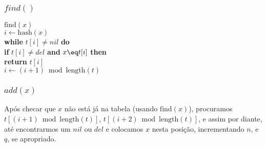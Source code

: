 \documentclass{beamer}
\begin{document}
\begin{frame}
	\frametitle{$find()$}
\begin{oframed}
\begin{flushleft}
\hspace*{1em} \ensuremath{\mathrm{find}(x)}\\
\hspace*{1em} \hspace*{1em} \ensuremath{i \gets  \ensuremath{\mathrm{hash}(x)}}\\
\hspace*{1em} \hspace*{1em} {\color{black} \textbf{while}} \ensuremath{t[i] \ne nil} {\color{black} \textbf{do}} \\
\hspace*{1em} \hspace*{1em} \hspace*{1em} {\color{black} \textbf{if}} \ensuremath{t[i] \ne \mathit{del}} {\color{black} \textbf{and}} \ensuremath{x \eq t[i]} {\color{black} \textbf{then}}  \\
\hspace*{1em} \hspace*{1em} \hspace*{1em} \hspace*{1em} {\color{black} \textbf{return}} \ensuremath{t[i]}\\
\hspace*{1em} \hspace*{1em} \hspace*{1em} \ensuremath{i \gets  \ensuremath{(i + 1) \bmod  \mathrm{length}(t)}}\\
\end{flushleft}
\end{oframed}

\end{frame}

\begin{frame}
\frametitle{$add(x)$}

Após checar que $ \ensuremath{x}$ não está já na tabela (usando $ \ensuremath{\mathrm{find}(x)}$), procuramos $t[(\ensuremath{\ensuremath{i}}+1)\bmod \ensuremath{\ensuremath{\mathrm{length}(t)}}]$, $t[(\ensuremath{\ensuremath{i}}+2)\bmod \ensuremath{\ensuremath{\mathrm{length}(t)}}]$,
e assim por diante, até encontrarmos um \ensuremath{\ensuremath{\ensuremath{\mathit{nil}}}} ou \ensuremath{\ensuremath{\ensuremath{\mathit{del}}}} e colocamos \ensuremath{\ensuremath{x}} nesta posição,
incrementando \ensuremath{\ensuremath{n}}, e \ensuremath{\ensuremath{q}}, se apropriado.
\end{frame} 
\end{document}

